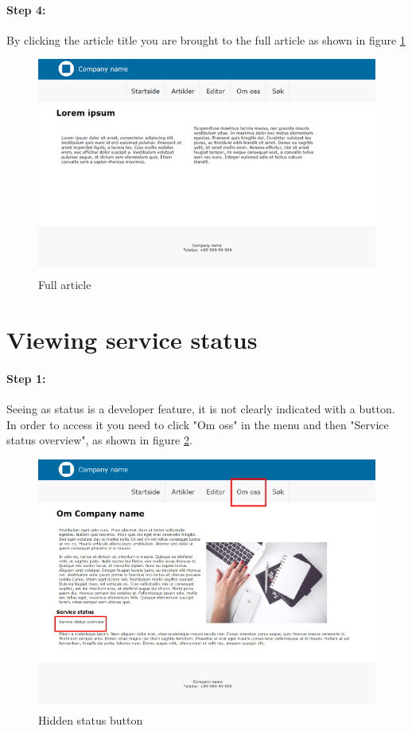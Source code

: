 \paragraph{Step 4:} By clicking the article title you are brought to the full article as shown in figure \ref{fig:manual10}

\begin{figure}[H]
    \centering
    \includegraphics[scale=0.70]{fig/userManual/10}
    \caption{Full article}
    \label{fig:manual10}
\end{figure}




\section{Viewing service status}

\paragraph{Step 1:} Seeing as status is a developer feature, it is not clearly indicated with a button. In order to access it you need to click "Om oss" in the menu and then "Service status overview", as shown in figure \ref{fig:manual14}.

\begin{figure}[H]
    \centering
    \includegraphics[scale=0.70]{fig/userManual/14}
    \caption{Hidden status button}
    \label{fig:manual14}
\end{figure}

